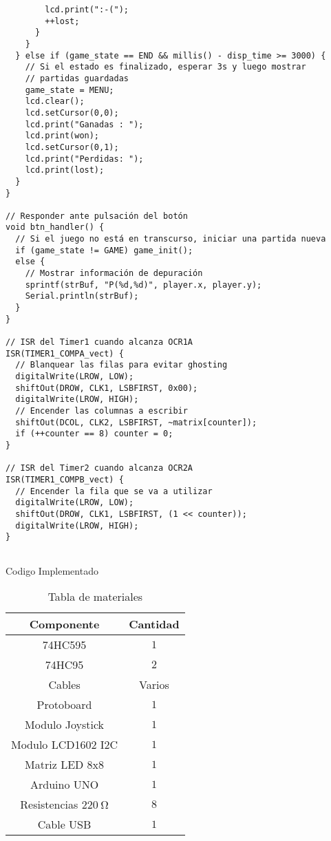 \begin{listing}[H]
     \scriptsize
  \begin{verbatim}
        lcd.print(":-(");
        ++lost;
      }
    }
  } else if (game_state == END && millis() - disp_time >= 3000) {
    // Si el estado es finalizado, esperar 3s y luego mostrar
    // partidas guardadas
    game_state = MENU;
    lcd.clear();
    lcd.setCursor(0,0);
    lcd.print("Ganadas : ");
    lcd.print(won);
    lcd.setCursor(0,1);
    lcd.print("Perdidas: ");
    lcd.print(lost);
  }
}

// Responder ante pulsación del botón
void btn_handler() {
  // Si el juego no está en transcurso, iniciar una partida nueva
  if (game_state != GAME) game_init();
  else {
    // Mostrar información de depuración
    sprintf(strBuf, "P(%d,%d)", player.x, player.y);
    Serial.println(strBuf);
  }
}

// ISR del Timer1 cuando alcanza OCR1A
ISR(TIMER1_COMPA_vect) {
  // Blanquear las filas para evitar ghosting
  digitalWrite(LROW, LOW);
  shiftOut(DROW, CLK1, LSBFIRST, 0x00);
  digitalWrite(LROW, HIGH);
  // Encender las columnas a escribir
  shiftOut(DCOL, CLK2, LSBFIRST, ~matrix[counter]);
  if (++counter == 8) counter = 0;
}

// ISR del Timer2 cuando alcanza OCR2A
ISR(TIMER1_COMPB_vect) {
  // Encender la fila que se va a utilizar
  digitalWrite(LROW, LOW);
  shiftOut(DROW, CLK1, LSBFIRST, (1 << counter));
  digitalWrite(LROW, HIGH);
}


      \end{verbatim}
  \caption{Codigo Implementado}
  \label{lst:cod-1}
\end{listing}

\clearpage
\begin{table}
  \centering
  \begin{tabular}{||c|c||}
    \hline
    Componente & Cantidad \\ \hline \hline
    74HC595 & $1$ \\ \hline
    74HC95 & $2$ \\ \hline 
    Cables & Varios \\ \hline
    Protoboard & $1$ \\ \hline
    Modulo Joystick & $1$ \\ \hline
    Modulo LCD1602 I2C & $1$ \\ \hline
    Matriz LED 8x8 & $1$ \\ \hline
    Arduino UNO & $1$ \\ \hline
    Resistencias $\SI{220}{\ohm}$ & $8$ \\ \hline
    Cable USB & $1$ \\ \hline 
  \end{tabular}
  \label{tab:materiales}
  \caption{Tabla de materiales}
\end{table}